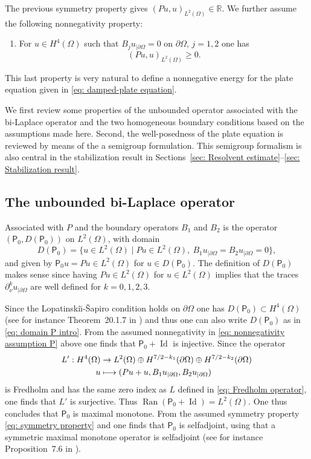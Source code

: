 \documentclass[JEP,XML,SOM,Unicode,published]{cedram}
\let\sep\mid
\newcommand\mto{\mathchoice{\longmapsto}{\mapsto}{\mapsto}{\mapsto}}
\theoremstyle{plain}
\theoremstyle{definition}
\def\R{\mathbb{R}}
\newcommand{\LS}{Lopatinski\u{\i}-\v{S}apiro\xspace}
\newcommand{\inp}[2]{(#1, #2)}
\newcommand{\Pell}{\mathsf P_0}
\DeclareMathOperator{\id}{Id}
\DeclareMathOperator{\range}{Ran}
\begin{document}
The previous symmetry property gives
$\inp{Pu}{u}_{L^2(\Omega)} \in \R$. We further assume the following
nonnegativity property:
\begin{enumerate}
\item[(iv)] For $u \in H^4(\Omega)$ such that
$B_j u_{|\partial \Omega} = 0$ on $\partial\Omega$, $j=1,2$ one has
\begin{equation}
\label{eq: nonnegativity assumption P}
\inp{Pu}{u}_{L^2(\Omega)}\geq 0.
\end{equation}
\end{enumerate}
This last property is very natural to define a nonnegative energy for the
plate equation given in \eqref{eq: damped-plate equation}.

We first review some properties of the unbounded operator
associated with the bi-Laplace operator and the two homogeneous
boundary conditions based on the assumptions made here. Second,
the well-posedness of the plate equation is reviewed by means of
the a semigroup formulation. This semigroup formalism is also
central in the stabilization result in Sections~\ref{sec: Resolvent estimate}--\ref{sec: Stabilization result}.

\subsection{The unbounded bi-Laplace operator}
\label{sec: unbounded bi-Laplace operator}

Associated with $P$ and the boundary operators $B_1$
and $B_2$ is the operator $(\Pell, D(\Pell))$ on $L^2(\Omega)$, with domain
\begin{equation*}
D(\Pell) = \big\{ u \in L^2(\Omega)\sep P u \in L^2(\Omega), \ B_1
u_{|\partial \Omega}
= B_2 u_{|\partial \Omega}=0\big\},
\end{equation*}
and given by $\Pell u = P u \in L^2(\Omega)$ for $u \in D(\Pell)$.
The definition of $D(\Pell)$ makes sense since having $P u \in
L^2(\Omega)$ for $u \in L^2(\Omega)$ implies that the traces $\partial_\nu^k
u_{|\partial \Omega}$ are well defined for $k=0, 1,2,3$.

Since the \LS condition holds on $\partial \Omega$ one has $D(\Pell)
\subset H^4(\Omega)$ (see for instance Theorem~20.1.7 in
\cite{Hoermander:V3}) and thus one can also write $D(\Pell)$ as in
\eqref{eq: domain P intro}.
From the assumed nonnegativity in \eqref{eq: nonnegativity assumption P} above one finds that
$\Pell + \id$ is injective. Since the operator
\begin{align*}
L': H^4 (\Omega) &\to L^2(\Omega) \oplus H^{7/2-k_1} (\partial \Omega)
\oplus H^{7/2-k_2} (\partial \Omega)\\
u & \mto (Pu +u, B_1 u_{|\partial \Omega} , B_2 u_{|\partial \Omega})
\end{align*}
is Fredholm and has the same zero index as $L$ defined in \eqref{eq:
Fredholm operator}, one finds that $L'$ is surjective. Thus
$\range(\Pell + \id) = L^2(\Omega)$.
One thus concludes that $\Pell$ is maximal monotone.
From the assumed symmetry property \eqref{eq: symmetry property} and
one finds that $\Pell$ is selfadjoint, using
that a symmetric maximal monotone operator is selfadjoint (see for
instance Proposition~7.6 in \cite{Brezis:11}).
\end{document}
